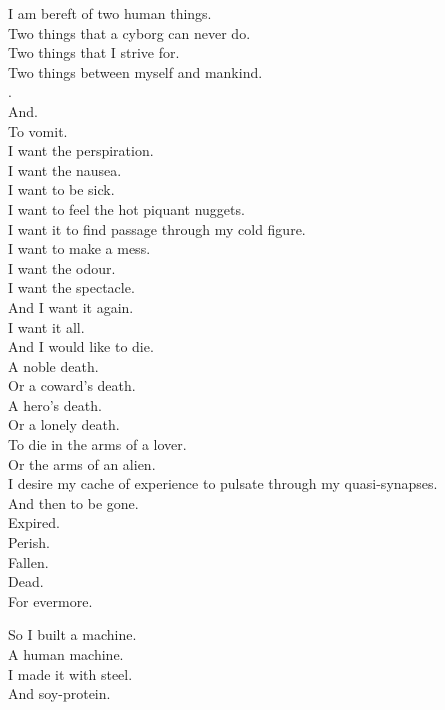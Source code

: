 I am bereft of two human things. \\
Two things that a cyborg can never do. \\
Two things that I strive for. \\
Two things between myself and mankind. \\

. \\
And. \\
To vomit. \\

I want the perspiration. \\
I want the nausea. \\
I want to be sick. \\
I want to feel the hot piquant nuggets. \\
I want it to find passage through my cold figure. \\
I want to make a mess. \\
I want the odour. \\
I want the spectacle. \\
And I want it again. \\
I want it all. \\

And I would like to die. \\
A noble death. \\
Or a coward's death. \\
A hero's death. \\
Or a lonely death. \\
To die in the arms of a lover. \\
Or the arms of an alien. \\
I desire my cache of experience to pulsate through my quasi-synapses. \\
And then to be gone. \\
Expired. \\
Perish. \\
Fallen. \\
Dead. \\
For evermore. \\





So I built a machine. \\
A human machine. \\
I made it with steel. \\
And soy-protein. \\

